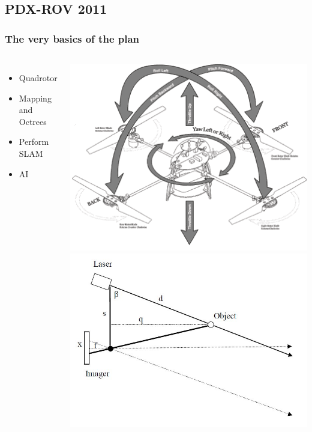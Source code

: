 \documentclass{beamer}
\begin{document}
\subsection{PDX-ROV 2011}
\frame
{
    \frametitle{The very basics of the plan}
    \begin{columns}[c]
    \begin{itemize}
        \item Quadrotor
        \item Mapping and Octrees
        \item Perform SLAM
        \item AI
    \end{itemize}
    \includegraphics[width=1\textwidth]{quadrotor_crop.png}
    \includegraphics[width=1\textwidth]{trig.jpg}

\end{columns}}
\end{document}
